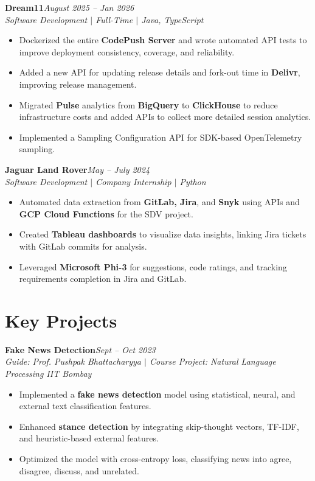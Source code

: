 \documentclass[10pt,a4paper]{article}
\newcommand{\resumeSection}[1]{
    \section*{#1}
}
\newcommand{\resumeEntry}[2]{
    \textbf{#1}\hfill{\small\textit{#2}}\\
}
\newcommand{\resumeSubheading}[1]{
    {\small\textit{#1}}\par
}
\begin{document}
\resumeEntry{Dream11}{August 2025 -- Jan 2026}
\resumeSubheading{Software Development $|$ Full-Time $|$ Java, TypeScript}

\begin{itemize}
    \item Dockerized the entire \textbf{CodePush Server} and wrote automated API tests to improve deployment consistency, coverage, and reliability.

    \item Added a new API for updating release details and fork-out time in \textbf{Delivr}, improving release management.

    \item Migrated \textbf{Pulse} analytics from \textbf{BigQuery} to \textbf{ClickHouse} to reduce infrastructure costs and added APIs to collect more detailed session analytics.

    \item Implemented a Sampling Configuration API for SDK-based OpenTelemetry sampling.
\end{itemize}

\resumeEntry{Jaguar Land Rover}{May -- July 2024}
\resumeSubheading{Software Development $|$ Company Internship $|$ Python}

\begin{itemize}
    \item Automated data extraction from \textbf{GitLab, Jira}, and \textbf{Snyk} using APIs and \textbf{GCP Cloud Functions} for the SDV project.

    \item Created \textbf{Tableau dashboards} to visualize data insights, linking Jira tickets with GitLab commits for analysis.

    \item Leveraged \textbf{Microsoft Phi-3} for suggestions, code ratings, and tracking requirements completion in Jira and GitLab.
\end{itemize}


\resumeSection{Key Projects}

\resumeEntry{Fake News Detection}{Sept -- Oct 2023}
\resumeSubheading{Guide: Prof. Pushpak Bhattacharyya $|$ Course Project: Natural Language Processing \hfill IIT Bombay}

\begin{itemize}
    \item Implemented a \textbf{fake news detection} model using statistical, neural, and external text classification features.

    \item Enhanced \textbf{stance detection} by integrating skip-thought vectors, TF-IDF, and heuristic-based external features.

    \item Optimized the model with cross-entropy loss, classifying news into agree, disagree, discuss, and unrelated.
\end{itemize}
\end{document}
